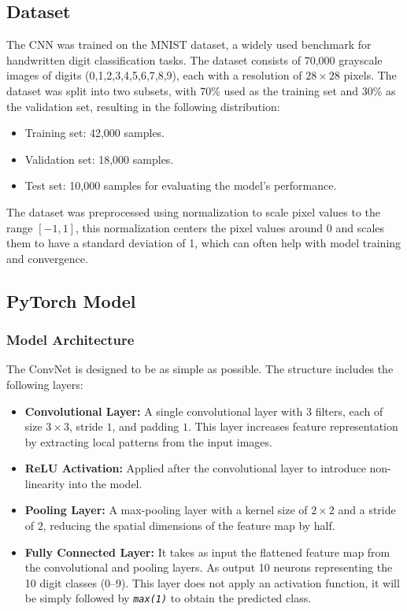 \documentclass{article}
\begin{document}
\subsection{Dataset}
The CNN was trained on the MNIST dataset, a widely used benchmark for handwritten digit classification tasks. The dataset consists of 70,000 grayscale images of digits (0,1,2,3,4,5,6,7,8,9), each with a resolution of $28 \times 28$ pixels. The dataset was split into two subsets, with 70\% used as the training set and 30\% as the validation set, resulting in the following distribution:

\begin{itemize}
    \item Training set: 42,000 samples.
    \item Validation set: 18,000 samples.
    \item Test set: 10,000 samples for evaluating the model's performance.
\end{itemize}

The dataset was preprocessed using normalization to scale pixel values to the range $[-1, 1]$, this normalization centers the pixel values around 0 and scales them to have a standard deviation of 1, which can often help with model training and convergence.


\subsection{PyTorch Model}

\subsubsection{Model Architecture}
The ConvNet is designed to be as simple as possible. The structure includes the following layers:
\begin{itemize}
    \item \textbf{Convolutional Layer:} A single convolutional layer with 3 filters, each of size $3 \times 3$, stride $1$, and padding $1$. This layer increases feature representation by extracting local patterns from the input images.
    \item \textbf{ReLU Activation:} Applied after the convolutional layer to introduce non-linearity into the model.
    \item \textbf{Pooling Layer:} A max-pooling layer with a kernel size of $2 \times 2$ and a stride of $2$, reducing the spatial dimensions of the feature map by half.
    \item \textbf{Fully Connected Layer:} It takes as input the flattened feature map from the convolutional and pooling layers. As output 10 neurons representing the 10 digit classes (0–9). This layer does not apply an activation function, it will be simply followed by \texttt{\textit{max(1)}} to obtain the predicted class.
\end{itemize}
\end{document}
